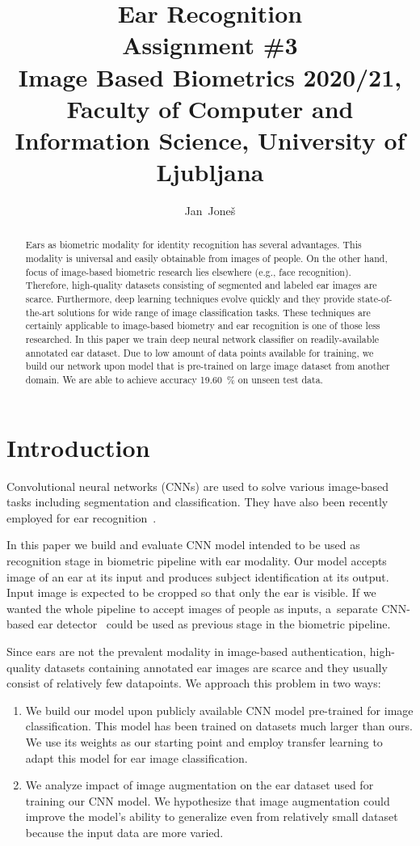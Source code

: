 \documentclass[9pt]{IEEEtran}
\title{\vspace{0ex} %
Ear Recognition
\\ \large{Assignment \#3}\\ \normalsize{Image Based Biometrics 2020/21, Faculty of Computer and Information Science, University of Ljubljana}}
\author{ %
Jan~Joneš
\vspace{-4.0ex}
}
\begin{document}
\maketitle

\begin{abstract}
    Ears as biometric modality for identity recognition has several advantages.
    This modality is universal and easily obtainable from images of people.
    On the other hand, focus of image-based biometric research lies elsewhere (e.g., face recognition).
    Therefore, high-quality datasets consisting of segmented and labeled ear images are scarce.
    Furthermore, deep learning techniques evolve quickly and they provide state-of-the-art solutions for wide range of image classification tasks.
    These techniques are certainly applicable to image-based biometry and ear recognition is one of those less researched.
    In this paper we train deep neural network classifier on readily-available annotated ear dataset.
    Due to low amount of data points available for training, we build our network upon model that is pre-trained on large image dataset from another domain.
    We are able to achieve accuracy 19.60~\% on unseen test data.
\end{abstract}

\section{Introduction}

Convolutional neural networks (CNNs) are used to solve various image-based tasks including segmentation and classification.
They have also been recently employed for ear recognition~\cite{emersic2017,dodge2018,emersic2019,eyiokur2017,zhang2018}.

In this paper we build and evaluate CNN model intended to be used as recognition stage in biometric pipeline with ear modality.
Our model accepts image of an ear at its input and produces subject identification at its output.
Input image is expected to be cropped so that only the ear is visible.
If we wanted the whole pipeline to accept images of people as inputs, a~separate CNN-based ear detector~\cite{emersic2018} could be used as previous stage in the biometric pipeline.

Since ears are not the prevalent modality in image-based authentication, high-quality datasets containing annotated ear images are scarce and they usually consist of relatively few datapoints.
We approach this problem in two ways:
\begin{enumerate}
    \item We build our model upon publicly available CNN model pre-trained for image classification.
          This model has been trained on datasets much larger than ours.
          We use its weights as our starting point and employ transfer learning to adapt this model for ear image classification.
    \item We analyze impact of image augmentation on the ear dataset used for training our CNN model.
          We hypothesize that image augmentation could improve the model's ability to generalize even from relatively small dataset because the input data are more varied.
\end{enumerate}
\end{document}
